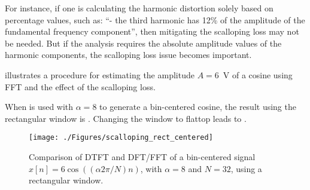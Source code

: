 For instance, if one is calculating the harmonic distortion solely based on percentage values, such as: ``- the third harmonic has 12\% of the amplitude of the fundamental frequency component'', then mitigating the scalloping loss may not be needed. But if the analysis requires the absolute amplitude values of the harmonic components, the scalloping loss issue 
becomes important.


 illustrates a procedure for estimating the amplitude $A=6$~V of a cosine using FFT and the
effect of the scalloping loss.


When  is used with $\alpha=8$ to generate a bin-centered cosine,
the result using the rectangular window is .
Changing the window to flattop leads to .

\begin{figure}[htbp]
\centering
\texttt{[image: ./Figures/scalloping\_rect\_centered]}
\caption{Comparison of DTFT and DFT/FFT of a bin-centered signal $x[n]=6\cos((\alpha 2 \pi /N) n)$, with $\alpha=8$ and $N=32$, using a rectangular window.\label{fig:scalloping_rect_centered}}
\end{figure}

